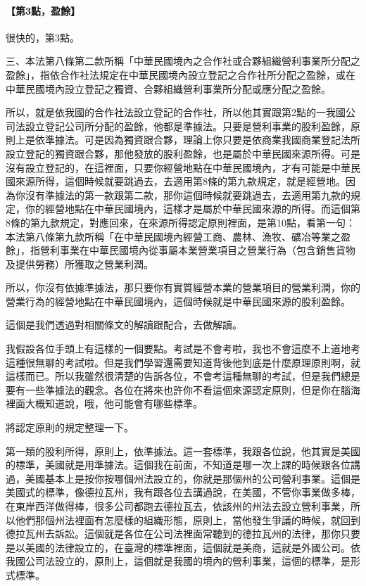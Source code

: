 \documentclass[oneside,sub3section]{ctexbook}
\let\oldparagraph\paragraph
\renewcommand{\paragraph}[1]{\oldparagraph{#1}\mbox{}}
\begin{document}
\hypertarget{ux7b2c3ux9edeux76c8ux9918}{%
\paragraph{【第3點，盈餘】}\label{ux7b2c3ux9edeux76c8ux9918}}

很快的，第3點。

三、本法第八條第二款所稱「中華民國境內之合作社或合夥組織營利事業所分配之盈餘」，指依合作社法規定在中華民國境內設立登記之合作社所分配之盈餘，或在中華民國境內設立登記之獨資、合夥組織營利事業所分配或應分配之盈餘。

所以，就是依我國的合作社法設立登記的合作社，所以他其實跟第2點的一我國公司法設立登記公司所分配的盈餘，他都是準據法。只要是營利事業的股利盈餘，原則上是依準據法。可是因為獨資跟合夥，理論上你只要是依商業我國商業登記法所設立登記的獨資跟合夥，那他發放的股利盈餘，也是屬於中華民國來源所得。可是沒有設立登記的，在這裡面，只要你經營地點在中華民國境內，才有可能是中華民國來源所得，這個時候就要跳過去，去適用第8條的第九款規定，就是經營地。因為你沒有準據法的第一款跟第二款，那你這個時候就要跳過去，去適用第九款的規定，你的經營地點在中華民國境內，這樣才是屬於中華民國來源的所得。而這個第8條的第九款規定，對應回來，在來源所得認定原則裡面，是第10點，看第一句：本法第八條第九款所稱「在中華民國境內經營工商、農林、漁牧、礦冶等業之盈餘」，指營利事業在中華民國境內從事屬本業營業項目之營業行為（包含銷售貨物及提供勞務）所獲取之營業利潤。

所以，你沒有依據準據法，那只要你有實質經營本業的營業項目的營業利潤，你的營業行為的經營地點在中華民國境內，這個時候就是中華民國來源的股利盈餘。

這個是我們透過對相關條文的解讀跟配合，去做解讀。

我假設各位手頭上有這樣的一個要點。考試是不會考啦，我也不會這麼不上道地考這種很無聊的考試啦。但是我們學習還需要知道背後他到底是什麼原理原則啊，就這樣而已。所以我雖然很清楚的告訴各位，不會考這種無聊的考試，但是我們總是要有一些準據法的觀念。各位在將來也許你不看這個來源認定原則，但是你在腦海裡面大概知道說，哦，他可能會有哪些標準。

將認定原則的規定整理一下。

第一類的股利所得，原則上，依準據法。這一套標準，我跟各位說，他其實是美國的標準，美國就是用準據法。這個我在前面，不知道是哪一次上課的時候跟各位講過，美國基本上是按你按哪個州法設立的，你就是那個州的公司營利事業。這個是美國式的標準，像德拉瓦州，我有跟各位去講過說，在美國，不管你事業做多棒，在東岸西洋做得棒，很多公司都跑去德拉瓦去，依該州的州法去設立營利事業，所以他們那個州法裡面有怎麼樣的組織形態，原則上，當他發生爭議的時候，就回到德拉瓦州去訴訟。這個就是各位在公司法裡面常聽到的德拉瓦州的法律，那你只要是以美國的法律設立的，在臺灣的標準裡面，這個就是美商，這就是外國公司。依我國公司法設立的，原則上，這個就是我國的境內的營利事業，這個的標準，是形式標準。
\end{document}
